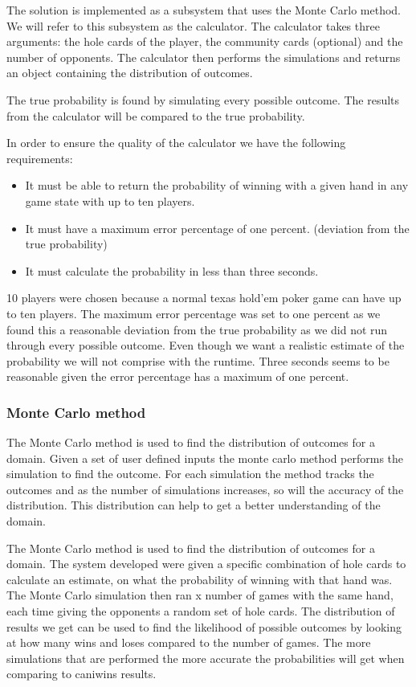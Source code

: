 The solution is implemented as a subsystem that uses the Monte Carlo method. We will refer to this subsystem as the calculator. The calculator takes three arguments: the hole cards of the player, the community cards (optional) and the number of opponents. The calculator then performs the simulations and returns an object containing the distribution of outcomes.

The true probability is found by simulating every possible outcome. The results from the calculator will be compared to the true probability.

In order to ensure the quality of the calculator we have the following requirements:
\begin{itemize}
\item It must be able to return the probability of winning with a given hand in any game state with up to ten players.
\item It must have a maximum error percentage of one percent. (deviation from the true probability)
\item It must calculate the probability in less than three seconds.
\end{itemize}

10 players were chosen because a normal texas hold'em poker game can have up to ten players.
The maximum error percentage was set to one percent as we found this a reasonable deviation from the true probability as we did not run through every possible outcome.
Even though we want a realistic estimate of the probability we will not comprise with the runtime. Three seconds seems to be reasonable given the error percentage has a maximum of one percent. 


\subsubsection{Monte Carlo method}
The Monte Carlo method is used to find the distribution of outcomes for a domain. Given a set of user defined inputs the monte carlo method performs the simulation to find the outcome. For each simulation the method tracks the outcomes and as the number of simulations increases, so will the accuracy of the distribution. This distribution can help to get a better understanding of the domain.

The Monte Carlo method is used to find the distribution of outcomes for a domain. The system developed were given a specific combination of hole cards to calculate an estimate, on what the probability of winning with that hand was. The Monte Carlo simulation then ran x number of games with the same hand, each time giving the opponents a random set of hole cards. The distribution of results we get can be used to find the likelihood of possible outcomes by looking at how many wins and loses compared to the number of games. The more simulations that are performed the more accurate the probabilities will get when comparing to caniwins results.

